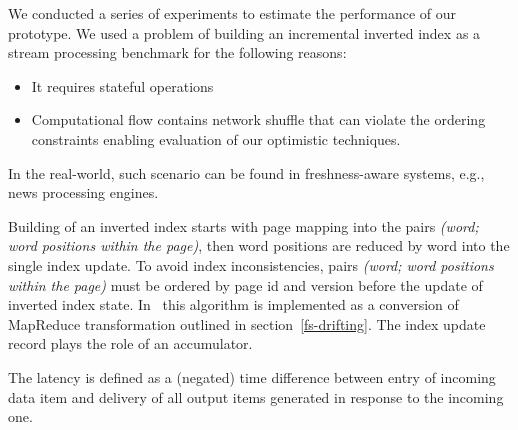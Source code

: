 
\label{fs-experiments-section}

We conducted a  series of experiments to estimate the performance of our  prototype. 
We used a problem of building an incremental inverted index as a stream processing benchmark  for the following reasons:

\begin{itemize}
    \item It requires stateful operations
    \item Computational flow contains network shuffle that can violate the ordering constraints %
    enabling evaluation of our optimistic techniques.
\end{itemize}

In the real-world, such scenario can be found in freshness-aware systems, e.g., news processing engines.

Building of an inverted index %
starts with page mapping into the pairs {\it (word; word positions within the page)}, then  word positions are reduced by word into the single index update. 
%
To avoid index inconsistencies, pairs {\it (word; word positions within the page)} must be ordered by page id and version before the update of inverted index state. 
In \FlameStream\ this algorithm is implemented as a conversion of MapReduce transformation 
outlined in  section~\ref{fs-drifting}.
The index update record plays the role of an accumulator. 

The latency is defined as a (negated) time difference between entry of incoming data item and delivery of all output items generated in response to the incoming one.


